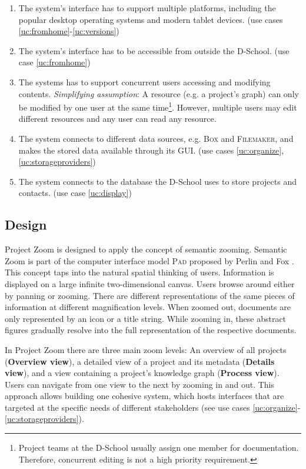 \begin{enumerate}
\item The system's interface has to support multiple platforms, including the popular desktop operating systems and modern tablet devices. (use cases \ref{uc:fromhome}-\ref{uc:versions}) \label{req:multiplatform}
\item The system's interface has to be accessible from outside the D-School. (use case \ref{uc:fromhome}) \label{req:fromhome}
\item The systems has to support concurrent users accessing and modifying contents. \textit{Simplifying assumption}: A resource (e.g. a project's graph) can only be modified by one user at the same time\footnote{Project teams at the D-School usually assign one member for documentation. Therefore, concurrent editing is not a high priority requirement.}. However, multiple users may edit different resources and any user can read any resource.\label{req:concurrency}
\item The system connects to different data sources, e.g. \textsc{Box} and \textsc{Filemaker}, and makes the stored data available through its GUI. (use cases \ref{uc:organize},\ref{uc:storageproviders}) \label{req:storageprovider}
\item The system connects to the database the D-School uses to store projects and contacts. (use case \ref{uc:display}) \label{req:filemaker}
\end{enumerate}

\subsection{Design}
\label{sec:design}

Project Zoom is designed to apply the concept of semantic zooming. Semantic Zoom is part of the computer interface model \textsc{Pad} proposed by Perlin and Fox \cite{Perlin_1993}. This concept taps into the natural spatial thinking of users. Information is displayed on a large infinite two-dimensional canvas. Users browse around either by panning or zooming. There are different representations of the same pieces of information at different magnification levels. When zoomed out, documents are only represented by an icon or a title string. While zooming in, these abstract figures gradually resolve into the full representation of the respective documents. 

In Project Zoom there are three main zoom levels: An overview of all projects (\textbf{Overview view}), a detailed view of a project and its metadata (\textbf{Details view}), and a view containing a project's knowledge graph (\textbf{Process view}). Users can navigate from one view to the next by zooming in and out. This approach allows building one cohesive system, which hosts interfaces that are targeted at the specific needs of different stakeholders (see use cases \ref{uc:organize}-\ref{uc:storageproviders}). 

